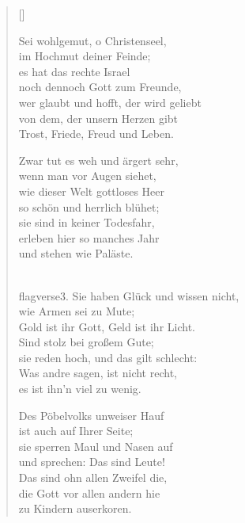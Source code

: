\begin{multicols}{2}
\settowidth{\versewidth}{ein frommer Mensch, der nicht geschwebt}
\begin{verse}[\versewidth]

 Sei wohlgemut, o Christenseel,\\
im Hochmut deiner Feinde;\\
es hat das rechte Israel\\
noch dennoch Gott zum Freunde,\\
wer glaubt und hofft, der wird geliebt\\
von dem, der unsern Herzen gibt\\
Trost, Friede, Freud und Leben.

 Zwar tut es weh und ärgert sehr,\\
wenn man vor Augen siehet,\\
wie dieser Welt gottloses Heer\\
so schön und herrlich blühet;\\
sie sind in keiner Todesfahr,\\
erleben hier so manches Jahr\\
und stehen wie Paläste.

\\flagverse{3.} Sie haben Glück und wissen nicht,\\
wie Armen sei zu Mute;\\
Gold ist ihr Gott, Geld ist ihr Licht.\\
Sind stolz bei großem Gute;\\
sie reden hoch, und das gilt schlecht:\\
Was andre sagen, ist nicht recht,\\
es ist ihn'n viel zu wenig.

 Des Pöbelvolks unweiser Hauf\\
ist auch auf Ihrer Seite;\\
sie sperren Maul und Nasen auf\\
und sprechen: Das sind Leute!\\
Das sind ohn allen Zweifel die,\\
die Gott vor allen andern hie\\
zu Kindern auserkoren.


\end{verse}
\end{multicols}
